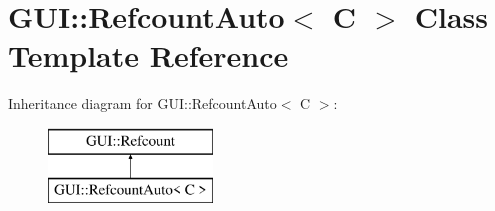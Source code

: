 \hypertarget{classGUI_1_1RefcountAuto}{\section{G\-U\-I\-:\-:Refcount\-Auto$<$ C $>$ Class Template Reference}
\label{classGUI_1_1RefcountAuto}
}
Inheritance diagram for G\-U\-I\-:\-:Refcount\-Auto$<$ C $>$\-:\begin{figure}[H]
\begin{center}
\leavevmode
\includegraphics[height=2.000000cm]{classGUI_1_1RefcountAuto}
\end{center}
\end{figure}
